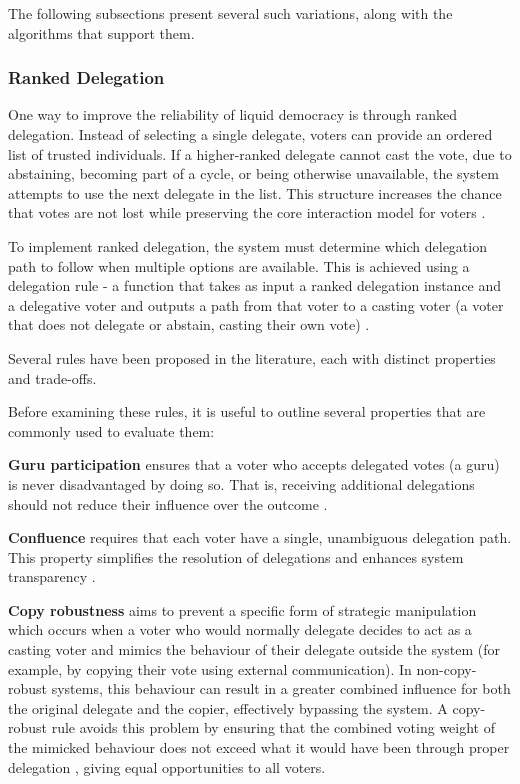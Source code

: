 The following subsections present several such variations, along with the algorithms that support them.
\subsubsection{Ranked Delegation}
One way to improve the reliability of liquid democracy is through ranked delegation. Instead of selecting a single delegate, voters can provide an ordered list of trusted individuals. If a higher-ranked delegate cannot cast the vote, due to abstaining, becoming part of a cycle, or being otherwise unavailable, the system attempts to use the next delegate in the list. This structure increases the chance that votes are not lost while preserving the core interaction model for voters \citep{brill_liquid_2022}.

To implement ranked delegation, the system must determine which delegation path to follow when multiple options are available. This is achieved using a delegation rule - a function that takes as input a ranked delegation instance and a delegative voter and outputs a path from that voter to a casting voter (a voter that does not delegate or abstain, casting their own vote) \citep{brill_liquid_2022}.

Several rules have been proposed in the literature, each with distinct properties and trade-offs.

Before examining these rules, it is useful to outline several properties that are commonly used to evaluate them:

\textbf{Guru participation} ensures that a voter who accepts delegated votes (a guru) is never disadvantaged by doing so. That is, receiving additional delegations should not reduce their influence over the outcome \citep{kotsialou_riley_2020}.

\textbf{Confluence} requires that each voter have a single, unambiguous delegation path. This property simplifies the resolution of delegations and enhances system transparency \citep{brill_liquid_2022}.

\textbf{Copy robustness} aims to prevent a specific form of strategic manipulation which occurs when a voter who would normally delegate decides to act as a casting voter and mimics the behaviour of their delegate outside the system (for example, by copying their vote using external communication). In non-copy-robust systems, this behaviour can result in a greater combined influence for both the original delegate and the copier, effectively bypassing the system. A copy-robust rule avoids this problem by ensuring that the combined voting weight of the mimicked behaviour does not exceed what it would have been through proper delegation \citep{brill_liquid_2022,behrens_2015}, giving equal opportunities to all voters.

